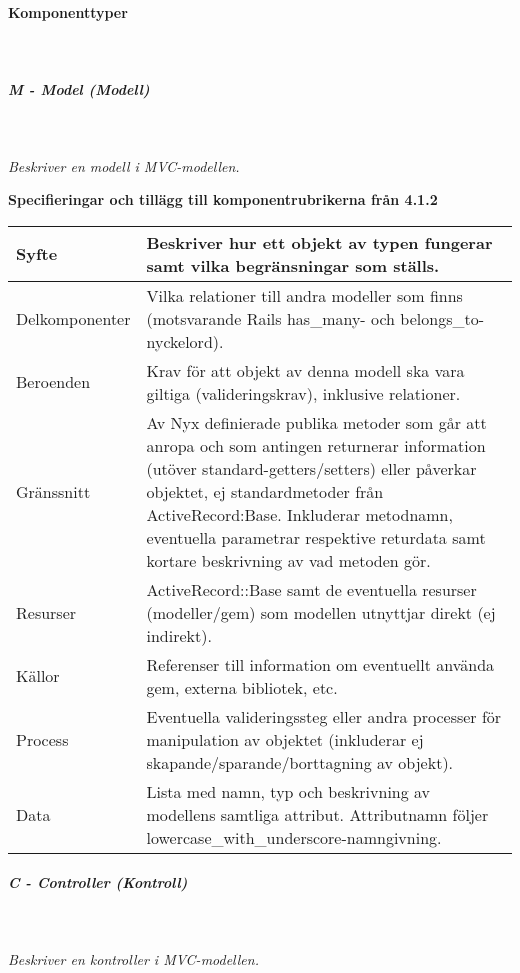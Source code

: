 \documentclass[a4paper, twoside, 11pt, titlepage]{article}
\begin{document}
			\paragraph{Komponenttyper}\


			\subparagraph{\emph{M - Model (\emph{Modell})}}\

				\emph{Beskriver en modell i MVC-modellen.}

				\textbf{Specifieringar och tillägg till komponentrubrikerna från 4.1.2}

				\begin {table} [ht] \begin{tabular} { p{2.6cm} p{12.5cm} }
					\hline
					{Syfte} & {Beskriver hur ett objekt av typen fungerar samt vilka begränsningar som ställs.} \\
					\hline
					{Delkomponenter} & {Vilka relationer till andra modeller som finns (motsvarande Rails has\_many- och belongs\_to-nyckelord).} \\
					\hline
					{Beroenden} & {Krav för att objekt av denna modell ska vara giltiga (valideringskrav), inklusive relationer.} \\
					\hline
					{Gränssnitt} & {Av Nyx definierade publika metoder som går att anropa och som antingen returnerar information (utöver standard-getters/setters) eller påverkar objektet, ej standardmetoder från ActiveRecord:Base. Inkluderar metodnamn, eventuella parametrar respektive returdata samt kortare beskrivning av vad metoden gör.} \\
					\hline
					{Resurser} & {ActiveRecord::Base samt de eventuella resurser (modeller/gem) som modellen utnyttjar direkt (ej indirekt).} \\
					\hline
					{Källor} & {Referenser till information om eventuellt använda gem, externa bibliotek, etc.} \\
					\hline
					{Process} & {Eventuella valideringssteg eller andra processer för manipulation av objektet (inkluderar ej skapande/sparande/borttagning av objekt).} \\
					\hline
					{Data} & {Lista med namn, typ och beskrivning av modellens samtliga attribut. Attributnamn följer lowercase\_with\_underscore-namngivning.} \\
					\hline
				\end{tabular} \end{table} \FloatBarrier


			\subparagraph{\emph{C - Controller (\emph{Kontroll})}}\

				\emph{Beskriver en kontroller i MVC-modellen.}
\end{document}

